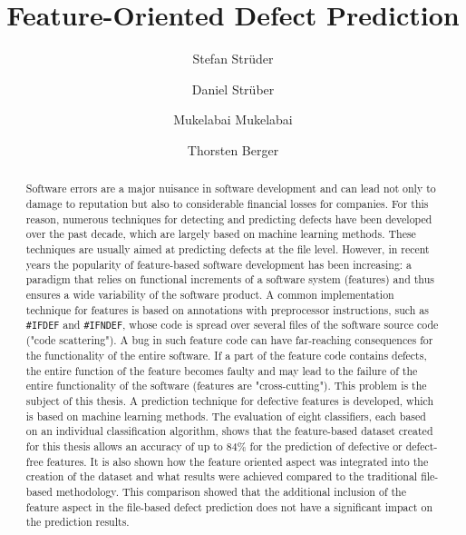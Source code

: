 \documentclass[sigconf]{acmart}
\begin{document}
\title{Feature-Oriented Defect Prediction}
\renewcommand{\shorttitle}{}

\author{Stefan Strüder}

\author{Daniel Strüber}

\author{Mukelabai Mukelabai}

\author{Thorsten Berger}

\renewcommand{\shortauthors}{}


\begin{abstract}
Software errors are a major nuisance in software development and can lead not only to damage to reputation but also to considerable financial losses for companies. For this reason, numerous techniques for detecting and predicting defects have been developed over the past decade, which are largely based on machine learning methods. These techniques are usually aimed at predicting defects at the file level. However, in recent years the popularity of feature-based software development has been increasing: a paradigm that relies on functional increments of a software system (features) and thus ensures a wide variability of the software product. A common implementation technique for features is based on annotations with preprocessor instructions, such as \texttt{\#IFDEF} and \texttt{\#IFNDEF}, whose code is spread over several files of the software source code ("code scattering"). A bug in such feature code can have far-reaching consequences for the functionality of the entire software. If a part of the feature code contains defects, the entire function of the feature becomes faulty and may lead to the failure of the entire functionality of the software (features are "cross-cutting"). This problem is the subject of this thesis. A prediction technique for defective features is developed, which is based on machine learning methods. The evaluation of eight classifiers, each based on an individual classification algorithm, shows that the feature-based dataset created for this thesis allows an accuracy of up to $84\%$ for the prediction of defective or defect-free features. It is also shown how the feature oriented aspect was integrated into the creation of the dataset and what results were achieved compared to the traditional file-based methodology. This comparison showed that the additional inclusion of the feature aspect in the file-based defect prediction does not have a significant impact on the prediction results.

\end{abstract}
\end{document}
